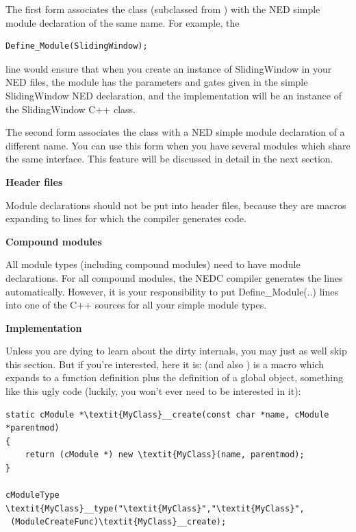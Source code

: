 The first form associates the class (subclassed from
) with the NED simple
module declaration of the same name. For example, the

\begin{verbatim}
Define_Module(SlidingWindow);
\end{verbatim}

line would ensure that when you create an instance of SlidingWindow in
your NED files, the module has the parameters and gates given in the
simple SlidingWindow NED declaration, and the implementation will be
an instance of the SlidingWindow C++ class.


The second form associates the class with a NED
simple module declaration of a different name.
You can use this form when you have several modules which share the
same interface. This feature will be discussed in detail in the next
section.


\textbf{Header files}


Module declarations should not be put into header files, because they are macros expanding to lines for which the
compiler generates code.


\textbf{Compound modules}

All module types (including compound modules)
need to have module declarations. For all
compound modules, the NEDC compiler generates the
 lines automatically.
However, it is your responsibility to put Define\_Module(..) lines into
one of the C++ sources for all your simple module types.


\textbf{Implementation}


Unless you are dying to learn about the dirty internals, you may just
as well skip this section. But if you're interested, here it is:
 (and also ) is a
macro which expands to a function definition plus the definition of a
global object, something like this ugly code (luckily, you won't ever
need to be interested in it):

\begin{Verbatim}[commandchars=\\\{\}]
static cModule *\textit{MyClass}__create(const char *name, cModule *parentmod)
{
    return (cModule *) new \textit{MyClass}(name, parentmod);
}

cModuleType \textit{MyClass}__type("\textit{MyClass}","\textit{MyClass}",
 (ModuleCreateFunc)\textit{MyClass}__create);
\end{Verbatim}


